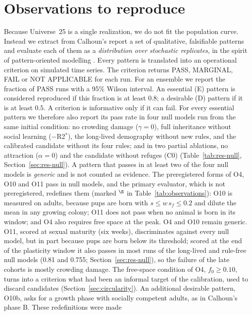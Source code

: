 \section{Observations to reproduce}
\label{sec:observations}

Because Universe~25 is a single realization, we do not fit the population curve.
Instead we extract from Calhoun's report \cite{Calhoun1973} a set of qualitative, falsifiable patterns and evaluate
each of them as a \emph{distribution over stochastic replicates}, in the spirit of pattern-oriented modelling
\cite{Grimm2005}.
Every pattern is translated into an operational criterion on simulated time series.
The criterion returns PASS, MARGINAL, FAIL or NOT APPLICABLE for each run.
For an ensemble we report the fraction of PASS runs with a 95\% Wilson interval.
An essential (E) pattern is considered reproduced if this fraction is at least $0.8$; a desirable (D) pattern if it is
at least $0.5$.
A criterion is informative only if it can fail. For every essential pattern we therefore also report its pass rate in
four null models run from the same initial condition: no crowding damage ($\gamma=0$), full inheritance without social
learning ($-$R2$^*$), the long-lived demography without new rules, and the calibrated candidate without its four
rules; and in two partial ablations, no attraction ($\alpha=0$) and the candidate without refuges (\textsf{C0})
(Table~\ref{tab:res-null}, Section~\ref{sec:res-null}). A pattern that passes in at least two of the four null models is
\emph{generic} and is not counted as evidence. The preregistered forms of O4, O10 and O11 pass in null
models, and the primary evaluator, which is not preregistered, redefines them (marked $^\S$ in
Table~\ref{tab:observations}): O10 is measured on adults, because pups are born with $s\le w\,s_f\le0.2$ and dilute
the mean in any growing colony; O11 does not pass when no animal is born in its window; and O4 also requires free
space at the peak. O4 and O10 remain generic. O11, scored at sexual
maturity (six weeks), discriminates against every null model, but in part because pups are born below its
threshold; scored at the end of the plasticity window it also passes in most runs of the long-lived and rule-free
null models (0.81 and 0.755; Section~\ref{sec:res-null}), so the failure of the late cohorts is mostly crowding damage. The free-space condition of O4, $f_0\ge0.10$, turns into a criterion what had been an informal
target of the calibration, used to discard candidates (Section~\ref{sec:circularity}). An additional desirable pattern,
O10b, asks for a growth phase with socially competent adults, as in Calhoun's phase B. These redefinitions were made
